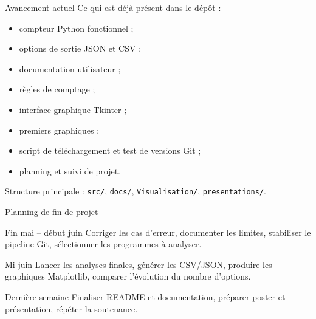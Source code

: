 \documentclass[10pt,aspectratio=169]{beamer}
\begin{document}
\begin{frame}{Avancement actuel}
  Ce qui est déjà présent dans le dépôt :

  \begin{itemize}
    \item compteur Python fonctionnel ;
    \item options de sortie JSON et CSV ;
    \item documentation utilisateur ;
    \item règles de comptage ;
    \item interface graphique Tkinter ;
    \item premiers graphiques ;
    \item script de téléchargement et test de versions Git ;
    \item planning et suivi de projet.
  \end{itemize}

  \vspace{0.3cm}
  Structure principale : \texttt{src/}, \texttt{docs/}, \texttt{Visualisation/}, \texttt{presentations/}.
\end{frame}

\begin{frame}{Planning de fin de projet}
  \begin{block}{Fin mai -- début juin}
    Corriger les cas d'erreur, documenter les limites, stabiliser le pipeline Git, sélectionner les programmes à analyser.
  \end{block}

  \begin{block}{Mi-juin}
    Lancer les analyses finales, générer les CSV/JSON, produire les graphiques Matplotlib, comparer l'évolution du nombre d'options.
  \end{block}

  \begin{block}{Dernière semaine}
    Finaliser README et documentation, préparer poster et présentation, répéter la soutenance.
  \end{block}
\end{frame}
\end{document}
